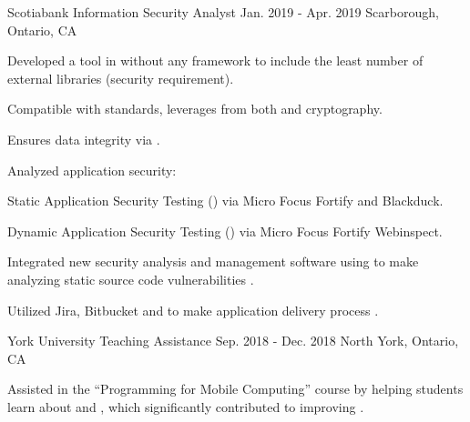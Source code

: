 \begin{cventries}
  \cventry
    {Scotiabank} %
    {Information Security Analyst} %
    {Jan. 2019 - Apr. 2019} %
    {Scarborough, Ontario, CA} %
    {
      \begin{cvitems} %
        \item {Developed a  tool in  without any framework to include the least number of external libraries (security requirement).}
          \begin{cvsubitems}
            \item {Compatible with  standards, leverages from both  and  cryptography.}
            \item {Ensures data integrity via .}
          \end{cvsubitems}
        \item {Analyzed application security:}
          \begin{cvsubitems}
            \item {Static Application Security Testing () via Micro Focus Fortify and Blackduck.}
            \item {Dynamic Application Security Testing () via Micro Focus Fortify Webinspect.}
          \end{cvsubitems}
        \item {Integrated new security analysis and management software using  to make analyzing static source code vulnerabilities .}
          \begin{cvsubitems}
            \item {Utilized Jira, Bitbucket and  to make application delivery process .}
          \end{cvsubitems}
      \end{cvitems}
    }

  \cventry
    {York University} %
    {Teaching Assistance} %
    {Sep. 2018 - Dec. 2018} %
    {North York, Ontario, CA} %
    {
      \begin{cvitems} %
        \item {Assisted in the “Programming for Mobile Computing” course by helping students learn about  and , which significantly contributed to improving .}
      \end{cvitems}
    }


\end{cventries}
